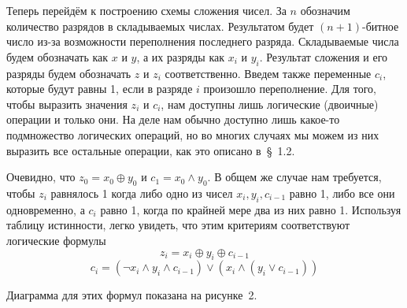 Теперь перейдём к построению схемы сложения чисел. За $n$ обозначим количество разрядов в складываемых числах. Результатом будет $(n+1)$-битное число из-за возможности переполнения последнего разряда. Складываемые числа будем обозначать как $x$ и $y$, а их разряды как $x_i$ и $y_i$. Результат сложения и его разряды будем обозначать $z$ и $z_i$ соответственно. Введем также переменные $c_i$, которые будут равны 1, если в разряде $i$ произошло переполнение. Для того, чтобы выразить значения $z_i$ и $c_i$, нам доступны лишь логические (двоичные) операции и только они. На деле нам обычно доступно лишь какое-то подмножество логических операций, но во многих случаях мы можем из них выразить все остальные операции, как это описано в~\S~1.2.

Очевидно, что $z_0 = x_0 \oplus y_0$ и $c_1 = x_0\land y_0$. В общем же случае нам требуется, чтобы $z_i$ равнялось 1 когда либо одно из чисел $x_i, y_i, c_{i-1}$ равно 1, либо все они одновременно, а $c_i$ равно 1, когда по крайней мере два из них равно 1. Используя таблицу истинности, легко увидеть, что этим критериям соответствуют логические формулы
$$z_i = x_i\oplus y_i \oplus c_{i-1}$$
$$c_i = (\neg x_i\land y_i \land c_{i-1}) \lor (x_i \land (y_i \lor c_{i-1}))$$

Диаграмма для этих формул показана на рисунке~2.

